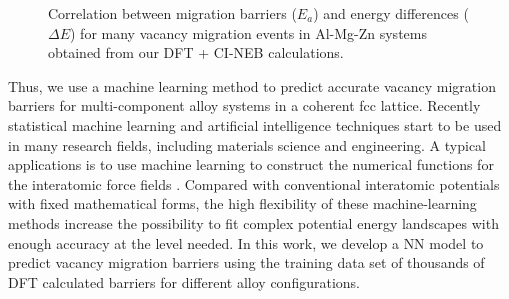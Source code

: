 \begingroup
\begin{figure}[!ht]
  \centering
\caption[Correlation between migration barriers ($E_a$) and energy differences ($\Delta E$) for many vacancy migration events in Al-Mg-Zn systems obtained from our DFT + \ac{CI-NEB} calculations.]{Correlation between migration barriers ($E_a$) and energy differences ($\Delta E$) for many vacancy migration events in Al-Mg-Zn systems obtained from our DFT + \ac{CI-NEB} calculations.}
  \label{Chap:Al/Vac:fig2}
\end{figure}
\endgroup


Thus, we use a machine learning method to predict accurate vacancy migration barriers for multi-component alloy systems in a coherent fcc lattice. Recently statistical machine learning and artificial intelligence techniques start to be used in many research fields, including materials science and engineering. A typical applications is to use machine learning to construct the numerical functions for the interatomic force fields \cite{bartok2010gaussian,behler2011atom,szlachta2014accuracy,artrith2016implementation,mehta2014exact,artrith2017efficient}. Compared with conventional interatomic potentials with fixed mathematical forms, the high flexibility of these machine-learning methods increase the possibility to fit complex potential energy landscapes with enough accuracy at the level needed. In this work, we develop a \acf{NN} model to predict vacancy migration barriers using the training data set of thousands of \ac{DFT} calculated barriers for different alloy configurations. 


